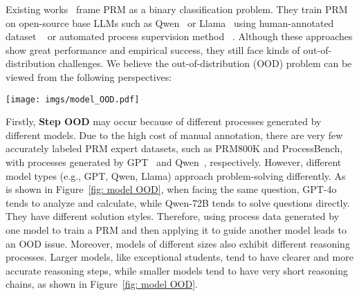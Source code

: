Existing works~\cite{wang2024openropensourceframework, skyworkopeno12024,zheng2024processbench} frame PRM as a binary classification problem. They train PRM on open-source base LLMs such as Qwen~\cite{yang2024qwen2} or Llama~\cite{dubey2024llama} using human-annotated dataset ~\cite{lightman2023let} or automated process supervision method ~\cite{wang2024math,luo2024improvemathematicalreasoninglanguage,qin2024o1replicationjourneystrategic}. Although these approaches show great performance and empirical success, they still face kinds of out-of-distribution challenges. 
We believe the out-of-distribution (OOD) problem can be viewed from the following perspectives:  

\begin{figure*}[t]
  \centering
  \vspace{-30pt}
  \texttt{[image: imgs/model\_OOD.pdf]}
  \vspace{-20pt}
  \caption{Processes and problem-solving ideas for the same question vary from different models with the perspectives of model types and model sizes. GPT tends to analyze and calculate, while Qwen-72B tends to solve equations. Qwen-1.5B is small and relatively weak. It can only enumerate, and its thinking chain is short, so its answers are also very wrong.}
  \label{fig: model OOD}
  \vspace{-10pt}
\end{figure*}

Firstly, \textbf{Step OOD} may occur because of different processes generated by different models. Due to the high cost of manual annotation, there are very few accurately labeled PRM expert datasets, such as PRM800K and ProcessBench, with processes generated by GPT~\cite{openai2023gpt} and Qwen~\cite{yang2024qwen2}, respectively. However, different model types (e.g., GPT, Qwen, Llama\cite{dubey2024llama}) approach problem-solving differently. As is shown in Figure~\ref{fig: model OOD}, when facing the same question, GPT-4o tends to analyze and calculate, while Qwen-72B tends to solve questions directly. They have different solution styles. Therefore, using process data generated by one model to train a PRM and then applying it to guide another model leads to an OOD issue. Moreover, models of different sizes also exhibit different reasoning processes. Larger models, like exceptional students, tend to have clearer and more accurate reasoning steps, while smaller models tend to have very short reasoning chains, as shown in Figure~\ref{fig: model OOD}.

